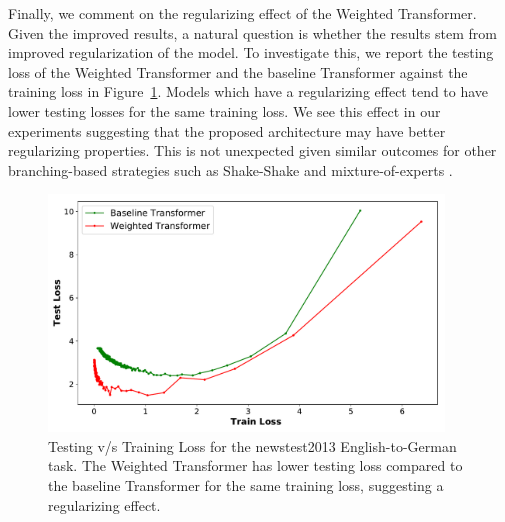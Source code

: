 \documentclass{article} %
\newcommand{\name}{Weighted Transformer\xspace}
\begin{document}
Finally, we comment on the regularizing effect of the \name.  Given the improved results, a natural question is whether the results stem from improved regularization of the model. To investigate this, we report the testing loss of the \name and the baseline Transformer against the training loss in Figure~\ref{fig:regu}. Models which have a regularizing effect tend to have lower testing losses for the same training loss. We see this effect in our experiments suggesting that the proposed architecture may have better regularizing properties. This is not unexpected given similar outcomes for other branching-based strategies such as Shake-Shake \cite{gastaldi2017shake} and mixture-of-experts \cite{shazeer2017outrageously}.



\begin{figure}
\begin{center}

\includegraphics[width=10.5cm]{plot_train_dev_loss}
\end{center}
\caption{Testing v/s Training Loss for the newstest2013 English-to-German task. The \name has lower testing loss compared to the baseline Transformer for the same training loss, suggesting a regularizing effect.  \label{fig:regu}}
\end{figure}



\end{document}
